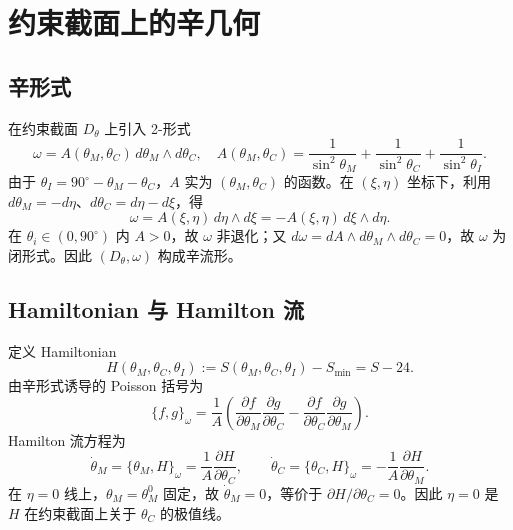 \documentclass[12pt,a4paper]{article}
\theoremstyle{definition}
\begin{document}
\section{约束截面上的辛几何}

\subsection{辛形式}

在约束截面 $D_\theta$ 上引入 2-形式
\begin{equation}
\boxed{\omega=A(\theta_M,\theta_C)\,d\theta_M\wedge d\theta_C,\quad A(\theta_M,\theta_C)=\frac{1}{\sin^2\theta_M}+\frac{1}{\sin^2\theta_C}+\frac{1}{\sin^2\theta_I}.}
\end{equation}
由于 $\theta_I=90^\circ-\theta_M-\theta_C$，$A$ 实为 $(\theta_M,\theta_C)$ 的函数。在 $(\xi,\eta)$ 坐标下，利用 $d\theta_M=-d\eta$、$d\theta_C=d\eta-d\xi$，得
\begin{equation}
\omega=A(\xi,\eta)\,d\eta\wedge d\xi=-A(\xi,\eta)\,d\xi\wedge d\eta.
\end{equation}
在 $\theta_i\in(0,90^\circ)$ 内 $A>0$，故 $\omega$ 非退化；又 $d\omega=dA\wedge d\theta_M\wedge d\theta_C=0$，故 $\omega$ 为闭形式。因此 $(D_\theta,\omega)$ 构成辛流形。

\subsection{Hamiltonian 与 Hamilton 流}

定义 Hamiltonian
\begin{equation}
H(\theta_M,\theta_C,\theta_I):=S(\theta_M,\theta_C,\theta_I)-S_{\min}=S-24.
\end{equation}
由辛形式诱导的 Poisson 括号为
\begin{equation}
\{f,g\}_\omega=\frac{1}{A}\left(\frac{\partial f}{\partial\theta_M}\frac{\partial g}{\partial\theta_C}-\frac{\partial f}{\partial\theta_C}\frac{\partial g}{\partial\theta_M}\right).
\end{equation}
Hamilton 流方程为
\begin{equation}
\dot\theta_M=\{\theta_M,H\}_\omega=\frac{1}{A}\frac{\partial H}{\partial\theta_C},\qquad \dot\theta_C=\{\theta_C,H\}_\omega=-\frac{1}{A}\frac{\partial H}{\partial\theta_M}.
\end{equation}
在 $\eta=0$ 线上，$\theta_M=\theta_M^0$ 固定，故 $\dot\theta_M=0$，等价于 $\partial H/\partial\theta_C=0$。因此 $\eta=0$ 是 $H$ 在约束截面上关于 $\theta_C$ 的极值线。
\end{document}
